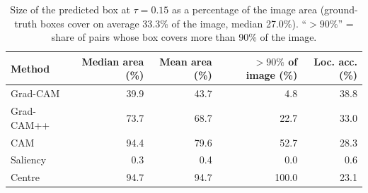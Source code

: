 \begin{table}[t]
\centering
\caption{Size of the predicted box at $\tau=0.15$ as a percentage of the image area (ground-truth boxes cover on average 33.3\% of the image, median 27.0\%). ``$>90\%$'' = share of pairs whose box covers more than 90\% of the image.}\label{tab:boxarea}
\begin{tabular}{lrrrr}
\toprule
Method & Median area (\%) & Mean area (\%) & $>90\%$ of image (\%) & Loc. acc. (\%) \\
\midrule
Grad-CAM & 39.9 & 43.7 & 4.8 & 38.8 \\
Grad-CAM++ & 73.7 & 68.7 & 22.7 & 33.0 \\
CAM & 94.4 & 79.6 & 52.7 & 28.3 \\
Saliency & 0.3 & 0.4 & 0.0 & 0.6 \\
Centre & 94.7 & 94.7 & 100.0 & 23.1 \\
\bottomrule
\end{tabular}
\end{table}
